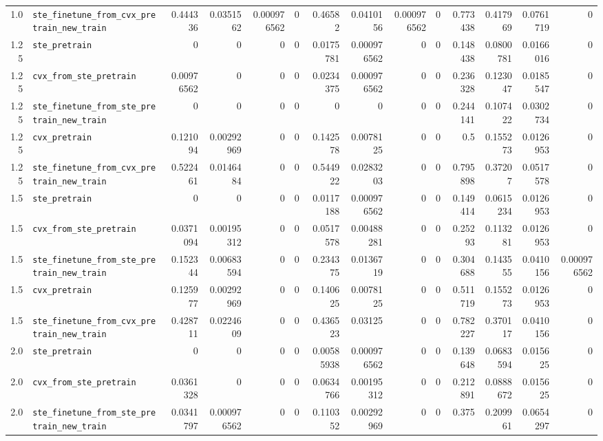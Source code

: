 \begin{longtable}{@{}r l *{12}{r}@{}}
1.0 & \texttt{ste\_finetune\_from\_cvx\_pretrain\_new\_train} & 0.444336 & 0.0351562 & 0.000976562 & 0 & 0.46582 & 0.0410156 & 0.000976562 & 0 & 0.773438 & 0.417969 & 0.0761719 & 0 \\
1.25 & \texttt{ste\_pretrain} & 0 & 0 & 0 & 0 & 0.0175781 & 0.000976562 & 0 & 0 & 0.148438 & 0.0800781 & 0.0166016 & 0 \\
1.25 & \texttt{cvx\_from\_ste\_pretrain} & 0.00976562 & 0 & 0 & 0 & 0.0234375 & 0.000976562 & 0 & 0 & 0.236328 & 0.123047 & 0.0185547 & 0 \\
1.25 & \texttt{ste\_finetune\_from\_ste\_pretrain\_new\_train} & 0 & 0 & 0 & 0 & 0 & 0 & 0 & 0 & 0.244141 & 0.107422 & 0.0302734 & 0 \\
1.25 & \texttt{cvx\_pretrain} & 0.121094 & 0.00292969 & 0 & 0 & 0.142578 & 0.0078125 & 0 & 0 & 0.5 & 0.155273 & 0.0126953 & 0 \\
1.25 & \texttt{ste\_finetune\_from\_cvx\_pretrain\_new\_train} & 0.522461 & 0.0146484 & 0 & 0 & 0.544922 & 0.0283203 & 0 & 0 & 0.795898 & 0.37207 & 0.0517578 & 0 \\
1.5 & \texttt{ste\_pretrain} & 0 & 0 & 0 & 0 & 0.0117188 & 0.000976562 & 0 & 0 & 0.149414 & 0.0615234 & 0.0126953 & 0 \\
1.5 & \texttt{cvx\_from\_ste\_pretrain} & 0.0371094 & 0.00195312 & 0 & 0 & 0.0517578 & 0.00488281 & 0 & 0 & 0.25293 & 0.113281 & 0.0126953 & 0 \\
1.5 & \texttt{ste\_finetune\_from\_ste\_pretrain\_new\_train} & 0.152344 & 0.00683594 & 0 & 0 & 0.234375 & 0.0136719 & 0 & 0 & 0.304688 & 0.143555 & 0.0410156 & 0.000976562 \\
1.5 & \texttt{cvx\_pretrain} & 0.125977 & 0.00292969 & 0 & 0 & 0.140625 & 0.0078125 & 0 & 0 & 0.511719 & 0.155273 & 0.0126953 & 0 \\
1.5 & \texttt{ste\_finetune\_from\_cvx\_pretrain\_new\_train} & 0.428711 & 0.0224609 & 0 & 0 & 0.436523 & 0.03125 & 0 & 0 & 0.782227 & 0.370117 & 0.0410156 & 0 \\
2.0 & \texttt{ste\_pretrain} & 0 & 0 & 0 & 0 & 0.00585938 & 0.000976562 & 0 & 0 & 0.139648 & 0.0683594 & 0.015625 & 0 \\
2.0 & \texttt{cvx\_from\_ste\_pretrain} & 0.0361328 & 0 & 0 & 0 & 0.0634766 & 0.00195312 & 0 & 0 & 0.212891 & 0.0888672 & 0.015625 & 0 \\
2.0 & \texttt{ste\_finetune\_from\_ste\_pretrain\_new\_train} & 0.0341797 & 0.000976562 & 0 & 0 & 0.110352 & 0.00292969 & 0 & 0 & 0.375 & 0.209961 & 0.0654297 & 0 \\

\end{longtable}

